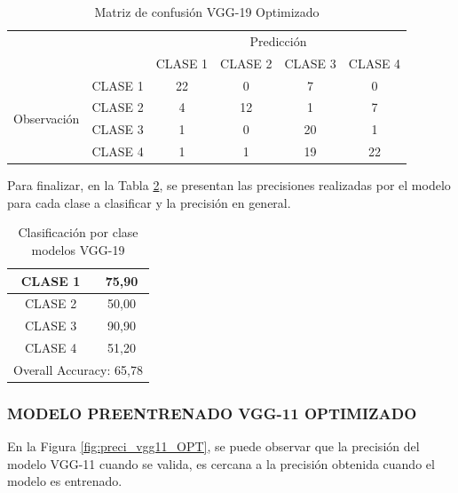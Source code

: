 \begin{table}[htbp]
	\centering
	\begin{tabular}{|c|l|c|c|c|c|}
		\hline
		\multicolumn{2}{|c|}{\multirow{2}[4]{*}{}} & \multicolumn{4}{c|}{Predicción} \bigstrut\\
		\cline{3-6}    \multicolumn{2}{|c|}{} & CLASE 1 & CLASE 2 & CLASE 3 & CLASE 4 \bigstrut\\
		\hline
		\multirow{4}[8]{*}{\begin{sideways}Observación\end{sideways}} & CLASE 1 & 22    & 0     & 7    & 0 \bigstrut\\
		\cline{2-6}          & CLASE 2 & 4     & 12     & 1    & 7 \bigstrut\\
		\cline{2-6}          & CLASE 3 & 1     & 0     & 20    & 1 \bigstrut\\
		\cline{2-6}          & CLASE 4 & 1     & 1     & 19    & 22 \bigstrut\\
		\hline
	\end{tabular}%
	\caption{Matriz de confusión VGG-19 Optimizado }
	\label{tab:MC_VGG19_OPT}%
\end{table}%


\newpage
Para finalizar, en la Tabla \ref{tab:VGG19optclases}, se presentan las precisiones realizadas por el modelo para cada clase a clasificar y la precisión en general.
\begin{table}[htbp]
	\centering
	\begin{tabular}{|c|c|}
		\hline
		CLASE 1 & 75,90 \bigstrut\\
		\hline
		CLASE 2 & 50,00 \bigstrut\\
		\hline
		CLASE 3 & 90,90 \bigstrut\\
		\hline
		CLASE 4 & 51,20 \bigstrut\\
		\hline
		\multicolumn{2}{|c|}{Overall Accuracy: 65,78} \bigstrut\\
		\hline
	\end{tabular}%
	\caption{Clasificación por clase modelos VGG-19}
	\label{tab:VGG19optclases}%
\end{table}%

\subsubsection{\MakeUppercase{Modelo preentrenado VGG-11 optimizado}}
En la Figura \ref{fig:preci_vgg11_OPT}, se puede observar que la precisión del modelo VGG-11 cuando se valida, es cercana a la precisión obtenida cuando el modelo es entrenado.

